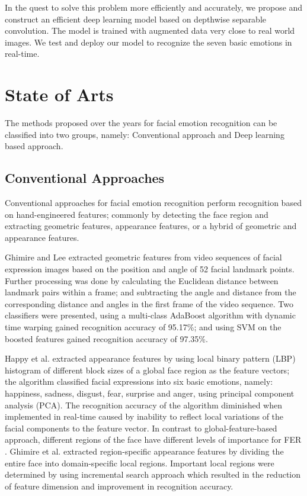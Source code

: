 \documentclass[master]{thesis-uestc}
\begin{document}
In the quest to solve this problem more efficiently and accurately, we propose and construct an efficient deep learning model based on depthwise separable convolution. The model is trained with augmented data very close to real world images. We test and deploy our model to recognize the seven basic emotions in real-time.

\section{State of Arts}
The methods proposed over the years for facial emotion recognition can be classified into two groups, namely: Conventional approach and Deep learning based approach.

\subsection{Conventional Approaches}
Conventional approaches for facial emotion recognition perform recognition based on hand-engineered features; commonly by detecting the face region and extracting geometric features, appearance features, or a hybrid of geometric and appearance features.

Ghimire and Lee extracted geometric features from video sequences of facial expression images based on the position and angle of 52 facial landmark points. Further processing was done by calculating the Euclidean distance between landmark pairs within a frame; and subtracting the angle and distance from the corresponding distance and angles in the first frame of the video sequence. Two classifiers were presented, using a multi-class AdaBoost algorithm with dynamic time warping gained recognition accuracy of 95.17\%; and using SVM on the boosted features gained recognition accuracy of 97.35\%.

Happy et al. extracted appearance features by using local binary pattern (LBP) histogram of different block sizes of a global face region as the feature vectors; the algorithm classified facial expressions into six basic emotions, namely: happiness, sadness, disgust, fear, surprise and anger, using principal component analysis (PCA). The recognition accuracy of the algorithm diminished when implemented in real-time caused by inability to reflect local variations of the facial components to the feature vector. In contrast to global-feature-based approach, different regions of the face have different levels of importance for FER . Ghimire et al. extracted region-specific appearance features by dividing the entire face into domain-specific local regions. Important local regions were determined by using incremental search approach which resulted in the reduction of feature dimension and improvement in recognition accuracy.
\end{document}
